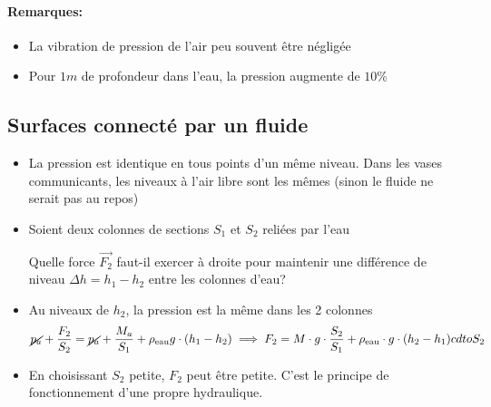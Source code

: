 \documentclass[
    11pt,
    a4paper,
    oneside,
    headinlcude, footinclude,
    twoside,
]{report}
\renewcommand{\vec}[1]{\overrightarrow{#1}}
\begin{document}
\paragraph{Remarques:}

\begin{itemize}
    \item La vibration de pression de l'air peu souvent être négligée
    \item Pour $1m$ de profondeur dans l'eau, la pression augmente de $10\%$
\end{itemize}

\subsection{Surfaces connect\'e par un fluide}
\label{sub:surfaces_connect'e_par_un_fluide}

\begin{itemize}
    \item  La pression est identique en tous points d'un m\^eme niveau. Dans
        les vases communicants, les niveaux \`a l'air libre sont les m\^emes
        (sinon le fluide ne serait pas au repos)
    \item Soient deux colonnes de sections $S_{1}$ et $S_{2}$ reli\'ees par l'eau

        \begin{center}
            \begin{minipage}{.5\linewidth}
            \end{minipage}
            \begin{minipage}{.49\linewidth}
                \setlength{\parskip}{.3em}
                    Quelle force $\vec{F_{2}}$ faut-il exercer \`a droite pour
                    maintenir une diff\'erence de niveau $\Delta h = h_{1} -
                    h_{2}$ entre les colonnes d'eau?
            \end{minipage}
        \end{center}

    \item Au niveaux de $h_{2}$, la pression est la m\^eme dans les 2 colonnes
        $$\cancel{p_{a}} + \frac{F_{2}}{S_{2}} = \cancel{p_{a}} +
        \frac{M_{a}}{S_{1}}+\rho_{\text{eau}} g \cdot (h_{1} - h_{2}) \implies
        F_{2} = M\cdot g \cdot \frac{S_{2}}{S_{1}} + \rho_{\text{eau}} \cdot g
        \cdot (h_{2} - h_{1}) cdto S_{2} $$
    \item En choisissant $S_{2}$ petite, $F_{2}$ peut \^etre petite. C'est le
        principe de fonctionnement d'une propre hydraulique.
\end{itemize}
\end{document}
